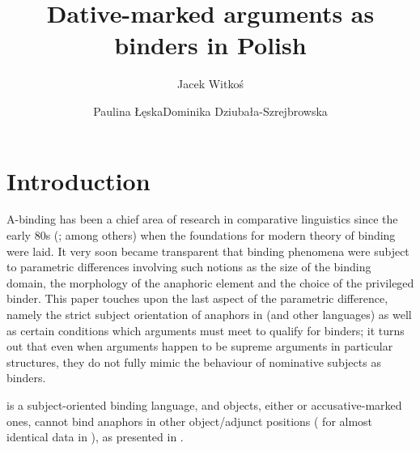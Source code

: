 \documentclass[output=paper,nonflat,colorlinks,citecolor=brown,newtxmath]{langsci/langscibook}
\author{Jacek Witkoś\affiliation{Adam Mickiewicz University in Poznań}\orcid{0000-0001-6462-3117}\and  Paulina Łęska\affiliation{Adam Mickiewicz University in Poznań}\orcid{0000-0002-8817-9409}\lastand  Dominika Dziubała-Szrejbrowska\affiliation{Adam Mickiewicz University in Poznań}\orcid{}}
\title{Dative-marked arguments as binders in Polish}
\begin{document}
\maketitle
{}

\section{Introduction}\label{sec:witkos:s1}

\sloppy A-binding has been a chief area of research in comparative linguistics since the early 80s (\citealt{chomsky1981,chomsky1986k,manzini1987,bellettirizzi1988,rappaport1986,willim1989,burzio1996anaphor,hellan1988,progovac1992,progovac1993,avrutin1994}; among others) when the foundations for modern theory of binding were laid. It very soon became transparent that binding phenomena were subject to parametric differences involving such notions as the size of the binding domain, the morphology of the anaphoric element and the choice of the privileged binder. This paper touches upon the last aspect of the parametric difference, namely the strict subject orientation of anaphors in  (and other  languages) as well as certain conditions which  arguments must meet to qualify for binders; it turns out that even when  arguments happen to be supreme arguments in particular structures, they do not fully mimic the behaviour of nominative subjects as binders.

 is a subject-oriented binding language, and objects, either  or accusative-marked ones, cannot bind anaphors in other object/adjunct positions (\citealt{willim1989,reinders1991,rappaport1986} for almost identical data in ), as presented in .
\end{document}
